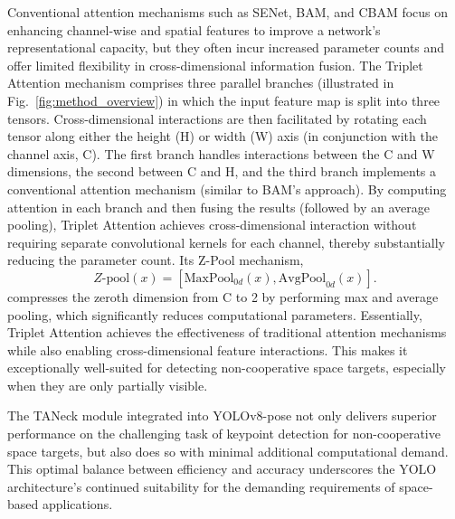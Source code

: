 \documentclass[a4paper,fleqn]{cas-sc}
\begin{document}
Conventional attention mechanisms such as SENet, BAM, and CBAM \citep{senet, bam, cbam} focus on enhancing channel-wise and spatial features to improve a network’s representational capacity, but they often incur increased parameter counts and offer limited flexibility in cross-dimensional information fusion. The Triplet Attention mechanism comprises three parallel branches (illustrated in Fig.~\ref{fig:method_overview}) in which the input feature map is split into three tensors. Cross-dimensional interactions are then facilitated by rotating each tensor along either the height (H) or width (W) axis (in conjunction with the channel axis, C). The first branch handles interactions between the C and W dimensions, the second between C and H, and the third branch implements a conventional attention mechanism (similar to BAM’s approach). By computing attention in each branch and then fusing the results (followed by an average pooling), Triplet Attention achieves cross-dimensional interaction without requiring separate convolutional kernels for each channel, thereby substantially reducing the parameter count. Its Z-Pool mechanism,
\begin{equation}
Z\text{-pool}(x) = [\text{MaxPool}_{0d}(x), \text{AvgPool}_{0d}(x)].
\end{equation}
compresses the zeroth dimension from C to 2 by performing max and average pooling, which significantly reduces computational parameters. Essentially, Triplet Attention achieves the effectiveness of traditional attention mechanisms while also enabling cross-dimensional feature interactions. This makes it exceptionally well-suited for detecting non-cooperative space targets, especially when they are only partially visible.

The TANeck module integrated into YOLOv8-pose not only delivers superior performance on the challenging task of keypoint detection for non-cooperative space targets, but also does so with minimal additional computational demand. This optimal balance between efficiency and accuracy underscores the YOLO architecture’s continued suitability for the demanding requirements of space-based applications.
\end{document}
